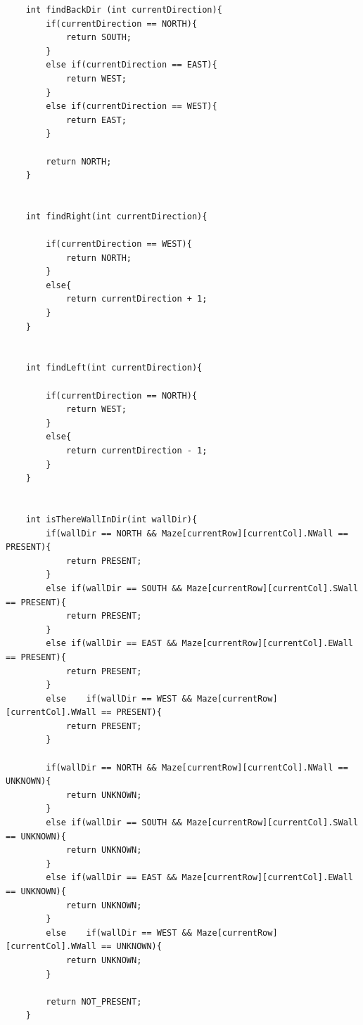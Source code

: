 \documentclass[11pt]{article}
\begin{document}
\begin{linenumbers}
\begin{verbatim}
    int findBackDir (int currentDirection){
        if(currentDirection == NORTH){
            return SOUTH;
        }
        else if(currentDirection == EAST){
            return WEST;
        }
        else if(currentDirection == WEST){
            return EAST;
        }

        return NORTH;
    }


    int findRight(int currentDirection){

        if(currentDirection == WEST){
            return NORTH;
        }
        else{
            return currentDirection + 1;
        }
    }


    int findLeft(int currentDirection){

        if(currentDirection == NORTH){
            return WEST;
        }
        else{
            return currentDirection - 1;
        }
    }


    int isThereWallInDir(int wallDir){
        if(wallDir == NORTH && Maze[currentRow][currentCol].NWall == PRESENT){
            return PRESENT;
        }
        else if(wallDir == SOUTH && Maze[currentRow][currentCol].SWall == PRESENT){
            return PRESENT;
        }
        else if(wallDir == EAST && Maze[currentRow][currentCol].EWall == PRESENT){
            return PRESENT;
        }
        else	if(wallDir == WEST && Maze[currentRow][currentCol].WWall == PRESENT){
            return PRESENT;
        }
        
        if(wallDir == NORTH && Maze[currentRow][currentCol].NWall == UNKNOWN){
            return UNKNOWN;
        }
        else if(wallDir == SOUTH && Maze[currentRow][currentCol].SWall == UNKNOWN){
            return UNKNOWN;
        }
        else if(wallDir == EAST && Maze[currentRow][currentCol].EWall == UNKNOWN){
            return UNKNOWN;
        }
        else	if(wallDir == WEST && Maze[currentRow][currentCol].WWall == UNKNOWN){
            return UNKNOWN;
        }

        return NOT_PRESENT;
    }
\end{verbatim}
\end{linenumbers}
\end{document}
